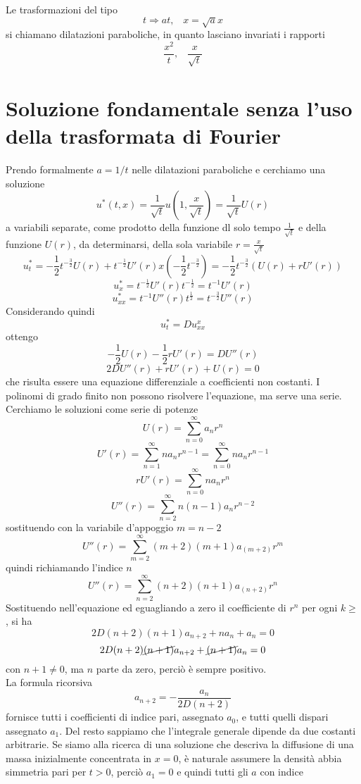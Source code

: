 Le trasformazioni del tipo
\[
	t\Rightarrow at, \;\;\; x=\sqrt{a} x
\]
si chiamano dilatazioni paraboliche, in quanto lasciano invariati i rapporti
\[
	\frac{x^2}{t}, \;\;\; \frac{x}{\sqrt{t}}
\]
\section{Soluzione fondamentale senza l'uso della trasformata di Fourier}
Prendo formalmente $a= 1/t$ nelle dilatazioni paraboliche e cerchiamo una
soluzione
\[
	u^*(t,x)= \frac{1}{\sqrt{t}}u \left( 1, \frac{x}{\sqrt{t}} \right)=
	\frac{1}{\sqrt{t}}U \left( r \right)
\]
a variabili separate, come prodotto della funzione dl solo tempo
$\frac{1}{\sqrt{t}}$ e della funzione $U(r)$, da determinarsi, della sola
variabile
$r=\frac{x}{\sqrt{t}}$
\[
	u^*_t= -\frac{1}{2}t^{-\frac{3}{2}} U(r)
	+ t^{-\frac{1}{2}}U'(r) x \left( -\frac{1}{2}t^{-\frac{3}{2}} \right)
	= -\frac{1}{2}t^{-\frac{3}{2}} \left( U(r)+ rU'(r) \right)
\]
\[
	u^*_x= t^{-\frac{1}{2}}U'(r)t^{-\frac{1}{2}}=
	t^{-1} U'(r)
\]
\[
	u^*_{xx}=t^{-1}U''(r)t^{\frac{1}{2}}=
	t^{-\frac{3}{2}}U''(r)
\]
Considerando quindi
\[
	u^*_t=Du^x_{xx}
\]
ottengo
\[
	-\frac{1}{2} U(r) -\frac{1}{2}rU'(r)= DU''(r)
\]
\[
	2DU''(r)+ rU'(r)+ U(r)= 0
\]
che risulta essere una equazione differenziale a coefficienti non costanti.
I polinomi di grado finito non possono risolvere l'equazione, ma serve una
serie.
Cerchiamo le soluzioni come serie di potenze
\[
	U(r)= \sum_{n=0}^{\infty}a_n r^n
\]
\[
	U'(r)= \sum_{n=1}^{\infty} n a_n r^{n-1}
	= \sum_{n=0}^{\infty} n a_n r^{n-1}
\]
\[
	rU'(r)= \sum_{n=0}^{\infty} na_n r^n
\]
\[
	U''(r)=\sum_{n=2}^{\infty} n(n-1)a_n r^{n-2}
\]
sostituendo con la variabile d'appoggio $m=n-2$
\[
	U''(r)=\sum_{m=2}^{\infty} (m+2)(m+1)a_(m+2) r^{m}
\]
quindi richiamando l'indice $n$
\[
	U''(r)=\sum_{n=2}^{\infty} (n+2)(n+1)a_(n+2) r^{n}
\]
Sostituendo nell'equazione ed eguagliando a zero il coefficiente di $r^n$ per
ogni $k \geq $, si ha
\[
	2D(n+2)(n+1)a_{n+2}+ na_n+ a_n = 0
\]
\[
	2D(n+2)\cancel{(n+1)}a_{n+2}+ \cancel{(n+1)}a_n=0
\]
con $n+1 \neq 0$, ma $n$ parte da zero, perci\`o \`e sempre positivo.\\
La formula ricorsiva
\[
	a_{n+2}= -\frac{a_n}{2D(n+2)}
\]
fornisce tutti i coefficienti di indice pari, assegnato $a_0$, e tutti quelli
dispari assegnato $a_1$.
Del resto sappiamo che l'integrale generale dipende da due costanti arbitrarie.
Se siamo alla ricerca di una soluzione che descriva la diffusione di una massa
inizialmente concentrata in $x=0$, \`e naturale assumere la densit\`a abbia
simmetria pari per $t>0$, perci\`o $a_1=0$ e quindi tutti gli $a$ con indice
